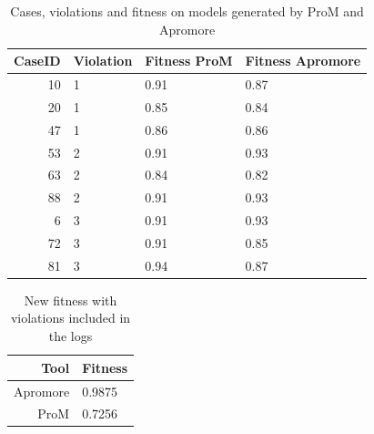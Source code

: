 \begin{table}[H]
\centering
\begin{tabular}{|r|l|l|l|}
\hline
\textbf{CaseID} & \textbf{Violation} & \textbf{Fitness ProM} & \textbf{Fitness Apromore} \\
\hline
10 & 1 & 0.91 & 0.87 \\
\hline
20 & 1 & 0.85 & 0.84 \\
\hline
47 & 1 & 0.86 & 0.86 \\
\hline
53 & 2 & 0.91 & 0.93 \\
\hline
63 & 2 & 0.84 & 0.82 \\
\hline
88 & 2 & 0.91 & 0.93 \\
\hline
6 & 3 & 0.91 & 0.93 \\
\hline
72 & 3 & 0.91 & 0.85 \\
\hline
81 & 3 & 0.94 & 0.87 \\
\hline
\end{tabular}
\caption{Cases, violations and fitness on models generated by ProM and Apromore}
\label{tab:violations}
\end{table}

\begin{table}[H]
\centering
\begin{tabular}{|r|l|}
\hline
\textbf{Tool} & \textbf{Fitness} \\
\hline
Apromore & 0.9875 \\
\hline
ProM & 0.7256 \\
\hline
\end{tabular}
\caption{New fitness with violations included in the logs}
\label{tab:violations_fitness}
\end{table}
